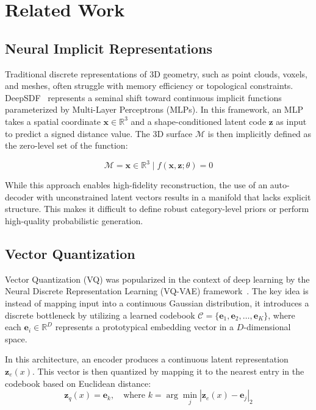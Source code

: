 \documentclass[11pt, a4paper]{article}
\begin{document}
\section{Related Work}

\subsection{Neural Implicit Representations}
Traditional discrete representations of 3D geometry, such as point clouds, voxels, and meshes, often struggle with memory efficiency or topological constraints. DeepSDF~\cite{Park_2019_CVPR} represents a seminal shift toward continuous implicit functions parameterized by Multi-Layer Perceptrons (MLPs). In this framework, an MLP takes a spatial coordinate $\mathbf{x} \in \mathbb{R}^3$ and a shape-conditioned latent code $\mathbf{z}$ as input to predict a signed distance value. The 3D surface $\mathcal{M}$ is then implicitly defined as the zero-level set of the function:

\begin{equation}
\mathcal{M} = {\mathbf{x} \in \mathbb{R}^3 \mid f(\mathbf{x}, \mathbf{z}; \theta) = 0}
\end{equation}

While this approach enables high-fidelity reconstruction, the use of an auto-decoder with unconstrained latent vectors results in a manifold that lacks explicit structure. This makes it difficult to define robust category-level priors or perform high-quality probabilistic generation.

\subsection{Vector Quantization}
Vector Quantization (VQ) was popularized in the context of deep learning by the Neural Discrete Representation Learning (VQ-VAE) framework~\cite{oord2018neuraldiscreterepresentationlearning}. The key idea is instead of mapping input into a continuous Gaussian distribution, it introduces a discrete bottleneck by utilizing a learned codebook $\mathcal{C} = \{\mathbf{e}_1, \mathbf{e}_2, \dots, \mathbf{e}_K\}$, where each $\mathbf{e}_i \in \mathbb{R}^D$ represents a prototypical embedding vector in a $D$-dimensional space.

In this architecture, an encoder produces a continuous latent representation $\mathbf{z}_e(x)$. This vector is then quantized by mapping it to the nearest entry in the codebook based on Euclidean distance:\begin{equation}\mathbf{z}_q(x) = \mathbf{e}_k, \quad \text{where } k = \arg\min_j |\mathbf{z}_e(x) - \mathbf{e}_j|_2\end{equation}
\end{document}
